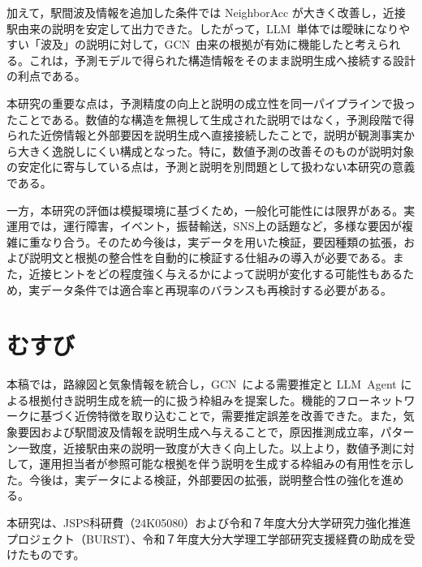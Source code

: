\documentclass[technicalreport]{ieicej}
\newcommand{\LLM}{LLM}
\newcommand{\GCN}{GCN}
\begin{document}
加えて，駅間波及情報を追加した条件では NeighborAcc が大きく改善し，近接駅由来の説明を安定して出力できた。したがって，\LLM\ 単体では曖昧になりやすい「波及」の説明に対して，\GCN\ 由来の根拠が有効に機能したと考えられる。これは，予測モデルで得られた構造情報をそのまま説明生成へ接続する設計の利点である。

本研究の重要な点は，予測精度の向上と説明の成立性を同一パイプラインで扱ったことである。数値的な構造を無視して生成された説明ではなく，予測段階で得られた近傍情報と外部要因を説明生成へ直接接続したことで，説明が観測事実から大きく逸脱しにくい構成となった。特に，数値予測の改善そのものが説明対象の安定化に寄与している点は，予測と説明を別問題として扱わない本研究の意義である。

一方，本研究の評価は模擬環境に基づくため，一般化可能性には限界がある。実運用では，運行障害，イベント，振替輸送，SNS上の話題など，多様な要因が複雑に重なり合う。そのため今後は，実データを用いた検証，要因種類の拡張，および説明文と根拠の整合性を自動的に検証する仕組みの導入が必要である。また，近接ヒントをどの程度強く与えるかによって説明が変化する可能性もあるため，実データ条件では適合率と再現率のバランスも再検討する必要がある。

\section{むすび}
本稿では，路線図と気象情報を統合し，\GCN\ による需要推定と \LLM\ Agent による根拠付き説明生成を統一的に扱う枠組みを提案した。機能的フローネットワークに基づく近傍特徴を取り込むことで，需要推定誤差を改善できた。また，気象要因および駅間波及情報を説明生成へ与えることで，原因推測成立率，パターン一致度，近接駅由来の説明一致度が大きく向上した。以上より，数値予測に対して，運用担当者が参照可能な根拠を伴う説明を生成する枠組みの有用性を示した。今後は，実データによる検証，外部要因の拡張，説明整合性の強化を進める。

\ack
本研究は、JSPS科研費（24K05080）および令和７年度大分大学研究力強化推進プロジェクト（BURST）、令和７年度大分大学理工学部研究支援経費の助成を受けたものです。



\appendix
\end{document}
